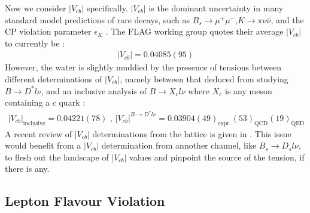 \documentclass[a4paper,10pt]{article}
\numberwithin{equation}{section}
\begin{document}
Now we consider $|V_{cb}|$ specifically. $|V_{cb}|$ is the dominant uncertainty in many standard model predictions of rare decays, such as $B_s \to \mu^+\mu^-$,$K\to\pi\nu\bar{\nu}$, and the CP violation parameter $\epsilon_K$ \cite{Na:2015kha}. The FLAG working group quotes their average $|V_{cb}|$ to currently be \cite{Aoki:2016frl}:
\begin{align}
	|V_{cb}| = 0.04085(95)
\end{align}
However, the water is slightly muddied by the presence of tensions between different determinations of $|V_{cb}|$, namely between that deduced from studying $B\to D^*l\nu$, and an inclusive analysis of $B\to X_c l\nu$ where $X_c$ is any meson containing a $c$ quark \cite{Na:2015kha}:
\begin{align}
	|V_{cb}|_{\text{inclusive}} = 0.04221(78) \text{ , } |V_{cb}|^{B\to D^* l\nu} = 0.03904(49)_{\text{expt.}}(53)_{\text{QCD}}(19)_{\text{QED}}
\end{align}
A recent review of $|V_{cb}|$ determinations from the lattice is given in \cite{Wingate:2017unz}. This issue would benefit from a $|V_{cb}|$ determination from annother channel, like $B_s\to D_s l\nu$, to flesh out the landscape of $|V_{cb}|$ values and pinpoint the source of the tension, if there is any.

\subsection{Lepton Flavour Violation}
\label{sec:anomalies}
\end{document}

